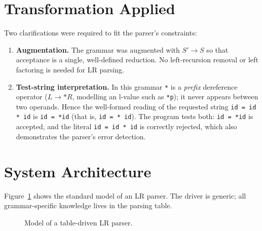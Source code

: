 \documentclass[11pt,a4paper]{report}
\begin{document}
\section{Transformation Applied}
Two clarifications were required to fit the parser's constraints:
\begin{enumerate}
  \item \textbf{Augmentation.} The grammar was augmented with $S' \rightarrow S$ so that acceptance is a single, well-defined reduction. No left-recursion removal or left factoring is needed for LR parsing.
  \item \textbf{Test-string interpretation.} In this grammar \texttt{*} is a \emph{prefix} dereference operator ($L \rightarrow {*}R$, modelling an l-value such as \texttt{*p}); it never appears between two operands. Hence the well-formed reading of the requested string \texttt{id = id * id} is \texttt{id = *id} (that is, \texttt{id = * id}). The program tests both: \texttt{id = *id} is accepted, and the literal \texttt{id = id * id} is correctly rejected, which also demonstrates the parser's error detection.
\end{enumerate}

\section{System Architecture}
Figure~\ref{fig:model} shows the standard model of an LR parser. The driver is
generic; all grammar-specific knowledge lives in the parsing table.

\begin{figure}[H]
\centering
{}
\caption{Model of a table-driven LR parser.}
\label{fig:model}
\end{figure}
\end{document}
